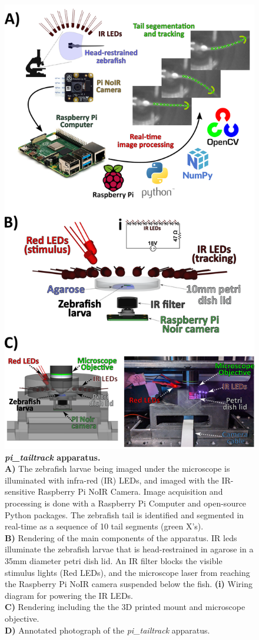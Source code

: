 \documentclass[9pt,lineno]{RandlettLab_elife}
\begin{document}
\begin{figure}
\begin{fullwidth}
\begin{center}

\includegraphics[width=0.58\linewidth]{Figure1_Apparatus.png}
\caption{\textbf{\emph{pi\_tailtrack} apparatus.}
\\ \textbf{A)} The zebrafish larvae being imaged under the microscope is illuminated with infra-red (IR) LEDs, and imaged with the IR-sensitive Raspberry Pi NoIR Camera. Image acquisition and processing is done with a Raspberry Pi Computer and open-source Python packages. The zebrafish tail is identified and segmented in real-time as a sequence of 10 tail segments (green X's). 
\\ \textbf{B)} Rendering of the main components of the apparatus. IR leds illuminate the zebrafish larvae that is head-restrained in agarose in a 35mm diameter petri dish lid. An IR filter blocks the visible stimulus lights (Red LEDs), and the microscope laser from reaching the Raspberry Pi NoIR camera suspended below the fish. \textbf{(i)} Wiring diagram for powering the IR LEDs. 
\\ \textbf{C)} Rendering including the the 3D printed mount and microscope objective. 
\\ \textbf{D)} Annotated photograph of the \emph{pi\_tailtrack} apparatus.  
} 

\label{fig:1}
\end{center}
\end{fullwidth}
\end{figure}
\end{document}
